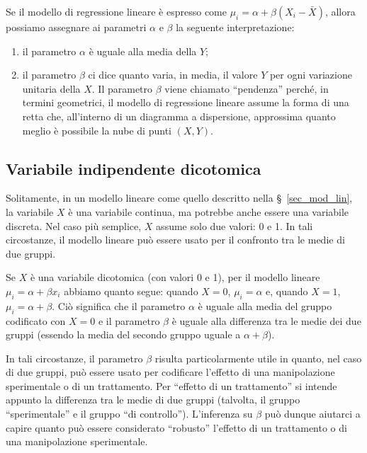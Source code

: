 Se il modello di regressione lineare è espresso come $\mu_i = \alpha + \beta(X_i - \bar{X})$, allora possiamo assegnare ai parametri $\alpha$ e $\beta$ la seguente interpretazione:
\begin{enumerate}
\item
il parametro $\alpha$ è uguale alla media della $Y$;
\item
il parametro $\beta$ ci dice quanto varia, in media, il valore $Y$ per ogni variazione unitaria della $X$.
Il parametro $\beta$ viene chiamato \enquote{pendenza} perché, in termini geometrici, il modello di regressione lineare assume la forma di una retta che, all'interno di un diagramma a dispersione, approssima quanto meglio è possibile la nube di punti $(X, Y)$.
\end{enumerate}


\subsection{Variabile indipendente dicotomica}
\label{sec_var_ind_dico}

Solitamente, in un modello lineare come quello descritto nella \S~\ref{sec_mod_lin}, la variabile $X$ è una variabile continua, ma potrebbe anche essere una variabile discreta.
Nel caso più semplice, $X$ assume solo due valori: 0 e 1.
In tali circostanze, il modello lineare può essere usato per il confronto tra le medie di due gruppi.

Se $X$ è una variabile dicotomica (con valori 0 e 1), per il modello lineare $\mu_i = \alpha + \beta x_i$ abbiamo quanto segue: quando $X=0$, $\mu_i = \alpha$ e, quando $X=1$, $\mu_i = \alpha + \beta$.
Ciò significa che il parametro $\alpha$ è uguale alla media del gruppo codificato con $X=0$ e 
il parametro $\beta$ è uguale alla differenza tra le medie dei due gruppi (essendo la media del secondo gruppo uguale a $\alpha + \beta$).

In tali circostanze, il parametro $\beta$ risulta particolarmente utile in quanto, nel caso di due gruppi, può essere usato per codificare l'effetto di una manipolazione sperimentale o di un trattamento.
Per \enquote{effetto di un trattamento} si intende appunto la differenza tra le medie di due gruppi (talvolta, il gruppo \enquote{sperimentale} e il gruppo \enquote{di controllo}).
L'inferenza su $\beta$ può dunque aiutarci a capire quanto può essere considerato \enquote{robusto} l'effetto di un trattamento o di una manipolazione sperimentale.



